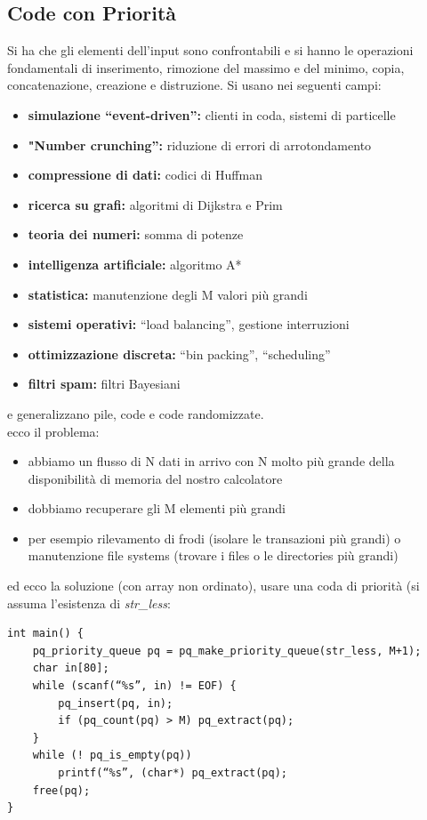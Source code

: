 \documentclass[a4paper,12pt, oneside]{book}
\begin{document}
\subsection{Code con Priorità}
Si ha che gli elementi dell'input sono confrontabili e si hanno le operazioni fondamentali di inserimento, rimozione del massimo e del minimo, copia, concatenazione, creazione e distruzione. Si usano nei seguenti campi:
\begin{itemize}
\item \textbf{simulazione “event-driven”:} clienti in coda, sistemi di particelle
\item \textbf{"Number crunching”:} riduzione di errori di arrotondamento
\item \textbf{compressione di dati:} codici di Huffman
\item \textbf{ricerca su grafi:} algoritmi di Dijkstra e Prim
\item \textbf{teoria dei numeri:} somma di potenze
\item \textbf{intelligenza artificiale:} algoritmo A*
\item \textbf{statistica:} manutenzione degli M valori più grandi
\item \textbf{sistemi operativi:} “load balancing”, gestione interruzioni
\item \textbf{ottimizzazione discreta:} “bin packing”, “scheduling”
\item \textbf{filtri spam:} filtri Bayesiani 
\end{itemize}
e generalizzano pile, code e code randomizzate.\\
ecco il problema:
\begin{itemize}
\item abbiamo un flusso di N dati in arrivo con N molto più grande della
disponibilità di memoria del nostro calcolatore
\item dobbiamo recuperare gli M elementi più grandi
\item per esempio rilevamento di frodi (isolare le transazioni più grandi) o manutenzione file systems (trovare i files o le directories più grandi)
\end{itemize}
ed ecco la soluzione (con array non ordinato), usare una coda di priorità (si assuma l'esistenza di \textit{str\_less}:
\begin{verbatim}
int main() {
    pq_priority_queue pq = pq_make_priority_queue(str_less, M+1);
    char in[80];
    while (scanf(“%s”, in) != EOF) {
        pq_insert(pq, in);
        if (pq_count(pq) > M) pq_extract(pq);
    }
    while (! pq_is_empty(pq))
        printf(“%s”, (char*) pq_extract(pq);
    free(pq);
}
\end{verbatim}
\end{document}
